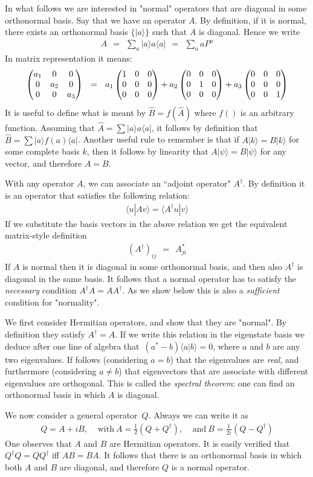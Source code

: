 \documentclass[onecolumn,fleqn]{revtex4}
\newcommand{\amatrix}[1]{\begin{matrix} #1 \end{matrix}}
\newcommand{\beq}{\begin{eqnarray}}
\newcommand{\eeq}{\end{eqnarray}}
\begin{document}
In what follows we are interested in "normal" 
operators that are diagonal in some orthonormal basis.  
Say that we have an operator ${A}$. 
By definition, if it is normal, there exists 
an orthonormal basis ${\{ |a\rangle \}}$ such that $A$ 
is diagonal. Hence we write 
\beq
A \ \ = \ \ \sum_{a}|a\rangle a\langle a| \ \ = \ \ \sum_{a}aP^{a} 
\eeq
In matrix representation it means:
\beq
\left( \amatrix{ a_1 & 0 & 0 \cr 0 & a_2 & 0 \cr 0 & 0 & a_3 } \right) 
\ \ = \ \ 
a_1 \left( \amatrix{ 1 & 0 & 0 \cr 0 & 0 & 0 \cr 0 & 0 & 0 } \right) 
+a_2 \left( \amatrix{ 0 & 0 & 0 \cr 0 & 1 & 0 \cr 0 & 0 & 0 } \right) 
+ a_3 \left( \amatrix{ 0 & 0 & 0 \cr 0 & 0 & 0 \cr 0 & 0 & 1} \right) 
\eeq
It is useful to define what is meant 
by ${\hat{B}=f(\hat{A})}$ where ${f()}$ is an 
arbitrary function. Assuming 
that ${\hat{A}=\sum |a\rangle a\langle a|}$, 
it follows by definition 
that ${\hat{B}=\sum |a\rangle f(a )\langle a|}$. 
Another useful rule to remember is that 
if ${A |k\rangle = B |k\rangle}$ for some 
complete basis ${k}$, then it follows by 
linearity that ${A |\psi\rangle = B |\psi\rangle}$ 
for any vector, and therefore ${A=B}$. 


With any operator $A$, we can associate an ``adjoint operator" $A^{\dagger}$. 
By definition it is an operator that satisfies the following relation: 
\beq
\langle u|A v \rangle = \langle A^{\dagger} u|v\rangle 
\eeq
If we substitute the basis vectors in the above 
relation we get the equivalent matrix-style definition 
\beq
(A^{\dagger})_{ij} \ \ = \ \ A_{ji}^{*}
\eeq
If $A$ is normal then it is diagonal in some 
orthonormal basis, and then also $A^{\dagger}$
is diagonal in the same basis.
It follows that a normal operator has 
to satisfy the {\em necessary} condition 
${A^{\dagger}A=AA^{\dagger}}$.
As we show below this is also a {\em sufficient} condition 
for "normality".  


We first consider Hermitian operators, 
and show that they are "normal". 
By definition they satisfy ${A^{\dagger}=A}$.
If we write this relation in the eigenstate basis 
we deduce after one line of algebra 
that~${(a^*-b)\langle a|b\rangle=0}$, 
where $a$ and $b$ are any two eigenvalues.
If follows (considering ${a=b}$) that the eigenvalues 
are {\em real}, and furthermore (considering ${a\ne b}$)
that eigenvectors that are associate 
with different eigenvalues are orthogonal.  
This is called the {\em spectral theorem}:
one can find an orthonormal basis in which $A$ is diagonal.

We now consider a general operator~$Q$.
Always we can write it as 
\beq
Q=A+iB, \ \ \ \ \  
\mbox{with} \ A=\frac{1}{2}(Q+Q^{\dagger}), \ \ \ \ \ 
\mbox{and} \ B=\frac{1}{2i}(Q-Q^{\dagger})
\eeq
One observes that $A$ and $B$ are Hermitian operators. 
It is easily verified that ${Q^{\dagger}Q=QQ^{\dagger}}$
iff $AB=BA$. It follows that there is 
an orthonormal basis in which both $A$ and $B$ are diagonal, 
and therefore $Q$ is a normal operator.
\end{document}
